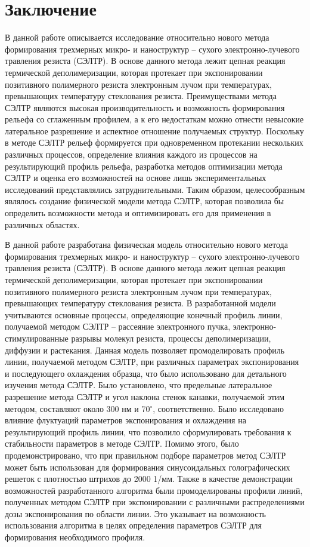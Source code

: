 \chapter*{Заключение}

В данной работе описывается исследование относительно нового метода формирования трехмерных микро- и наноструктур -- сухого электронно-лучевого травления резиста (СЭЛТР). В основе данного метода лежит цепная реакция термической деполимеризации, которая протекает при экспонировании позитивного полимерного резиста электронным лучом при температурах, превышающих температуру стеклования резиста. 
Преимуществами метода СЭЛТР являются высокая производительность и возможность формирования рельефа со сглаженным профилем, а к его недостаткам можно отнести невысокие латеральное разрешение и аспектное отношение получаемых структур. Поскольку в методе СЭЛТР рельеф формируется при одновременном протекании нескольких различных процессов, определение влияния каждого из процессов на результирующий профиль рельефа, разработка методов оптимизации метода СЭЛТР и оценка его возможностей на основе лишь экспериментальных исследований представлялись затруднительными. Таким образом, целесообразным являлось создание физической модели метода СЭЛТР, которая позволила бы определить возможности метода и оптимизировать его для применения в различных областях.

В данной работе разработана физическая модель относительно нового метода формирования трехмерных микро- и наноструктур -- сухого электронно-лучевого травления резиста (СЭЛТР). В основе данного метода лежит цепная реакция термической деполимеризации, которая протекает при экспонировании позитивного полимерного резиста электронным лучом при температурах, превышающих температуру стеклования резиста. В разработанной модели учитываются основные процессы, определяющие конечный профиль линии, получаемой методом СЭЛТР -- рассеяние электронного пучка, электронно-стимулированные разрывы молекул резиста, процессы деполимеризации, диффузии и растекания. Данная модель позволяет промоделировать профиль линии, получаемой методом СЭЛТР, при различных параметрах экспонирования и последующего охлаждения образца, что было использовано для детального изучения метода СЭЛТР. Было установлено, что предельные латеральное разрешение метода СЭЛТР и угол наклона стенок канавки, получаемой этим методом, составляют около 300 нм и 70$^\circ$, соответственно. Было исследовано влияние флуктуаций параметров экспонирования и охлаждения на результирующий профиль линии, что позволило сформулировать требования к стабильности параметров в методе СЭЛТР.  Помимо этого, было продемонстрировано, что при правильном подборе параметров метод СЭЛТР может быть использован для формирования синусоидальных голографических решеток с плотностью штрихов до 2000 1/мм. Также в качестве демонстрации возможностей разработанного алгоритма были промоделированы профили линий, полученных методом СЭЛТР при экспонировании с различными распределениями дозы экспонирования по области линии. Это указывает на возможность использования алгоритма в целях определения параметров СЭЛТР для формирования необходимого профиля.